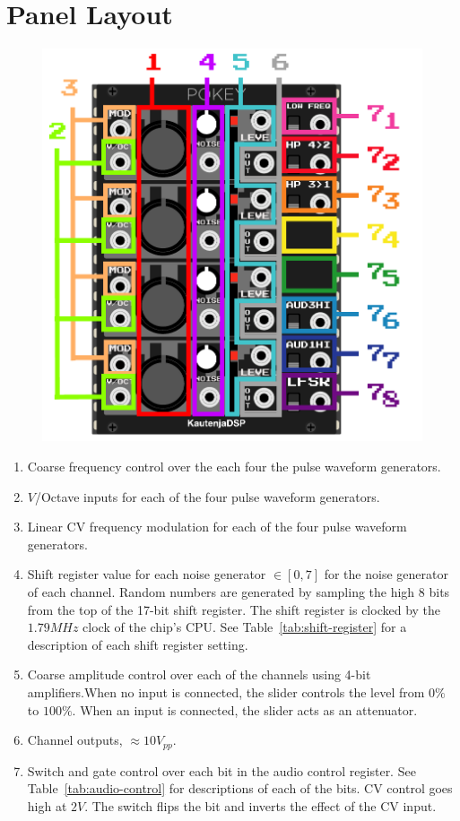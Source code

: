 \documentclass[12pt,a4paper]{article}
\begin{document}
\section{Panel Layout}
\begin{figure}[!htp]
\centering
\includegraphics{POKEY-Manual}
\end{figure}

\clearpage
\begin{enumerate}
  \item Coarse frequency control over the each four the pulse waveform generators.
  \item $V$/Octave inputs for each of the four pulse waveform generators.
  \item Linear CV frequency modulation for each of the four pulse waveform generators.
  \item Shift register value for each noise generator $\in [0, 7]$ for the noise generator of each channel. Random numbers are generated by sampling the high 8 bits from the top of the 17-bit shift register. The shift register is clocked by the $1.79MHz$ clock of the chip's CPU. See Table~\ref{tab:shift-register} for a description of each shift register setting.
  \item Coarse amplitude control over each of the channels using 4-bit amplifiers.When no input is connected, the slider controls the level from $0\%$ to $100\%$. When an input is connected, the slider acts as an attenuator.
  \item Channel outputs, ${\approx}10V_{pp}$.
  \item Switch and gate control over each bit in the audio control register. See Table~\ref{tab:audio-control} for descriptions of each of the bits. CV control goes high at $2V$. The switch flips the bit and inverts the effect of the CV input.
\end{enumerate}
\end{document}
